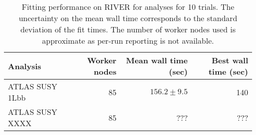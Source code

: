 \begin{table}[htpb]
\centering
\caption{Fitting performance on RIVER for analyses for 10 trials. The uncertainty on the mean wall time corresponds to the standard deviation of the fit times. The number of worker nodes used is approximate as per-run reporting is not available.}
\label{table:performance}
\begin{tabular}{@{}lrrr@{}}
\toprule
       Analysis & Worker nodes & Mean wall time (sec) & Best wall time (sec) \\
\midrule
ATLAS SUSY 1Lbb &           85 &        $156.2\pm9.5$ &                  140 \\
ATLAS SUSY XXXX &           85 &                  ??? &                  ??? \\
\bottomrule
\end{tabular}
\end{table}
